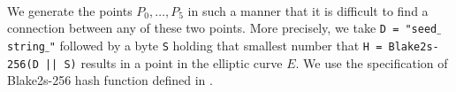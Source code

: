 {\color{blue}{Barry!}}\\
We generate the points $P_0,\dots,P_{{5}}$ in such a manner that it is difficult to find a connection between any of these two points. 
More precisely, we take 
	\texttt{D =  "seed$\_$string$\_$"} 
followed by a byte 
	\texttt{S} 
holding that smallest number that 
	\texttt{H = Blake2s-256(D || S)} 
results in a point in the elliptic curve $E$. We use the specification of Blake2s-256 hash function defined in
.
